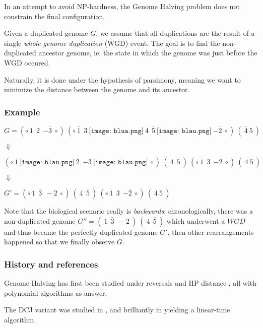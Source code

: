 \documentclass[11pt,final,twoside,nofrench]{thlifl}
\newcommand{\snd}[1]{ \ensuremath{\overline{#1}} }
\newcommand{\msnd}[1]{ \ensuremath{{-\overline{#1}}} }
\begin{document}
In an attempt to avoid NP-hardness, the Genome Halving problem does not constrain the final configuration.

Given a duplicated genome $G$, we assume that all duplications are the result of a single \emph{whole genome duplication} (WGD) event.
The goal is to find the non-duplicated ancestor genome, ie. the state in which the genome was just before the WGD occured.

Naturally, it is done under the hypothesis of parsimony, meaning we want to minimize the distance between the genome and its ancestor.

\subsubsection*{Example}
\label{soahalving}
\begin{center}

$G = (\circ~1~~2~~\msnd{3}~\circ)~(\circ~\snd{1}~~3~\texttt{[image: blua.png]}~4~~\snd{5}~\texttt{[image: blau.png]}~\msnd{2}~\circ)~(~\snd{4}~5~)$

$\Downarrow$

$ (\circ~1~\texttt{[image: blau.png]}~2~~\msnd{3}~\texttt{[image: blau.png]}~\circ)~(~4~~\snd{5}~)~(\circ~\snd{1}~~3~~\msnd{2}~\circ)~(~\snd{4}~5~)$

$\Downarrow$

$G' = (\circ~1~~\snd{3}~~-2~\circ)~(~4~~\snd{5}~)~(\circ~\snd{1}~~3~~\msnd{2}~\circ)~(~\snd{4}~5~)$

\end{center}

Note that the biological scenario really is \emph{backwards}: chronologically, there was a non-duplicated genome $G'' = (~1~~\snd{3}~~-2~)~(~4~~\snd{5}~)$ which underwent a $WGD$ and thus became the perfectly duplicated genome $G'$, then other rearrangements happened so that we finally observe $G$.

\subsubsection*{History and references}

Genome Halving has first been studied under reversals
\cite{Mabrouk98} and HP distance \cite{Mabrouk03,AP07}, all with polynomial algorithms as answer. 

The DCJ variant was studied in \cite{Warren08}, and brilliantly in \cite{Mixtacki08} yielding a linear-time algorithm.
\end{document}
